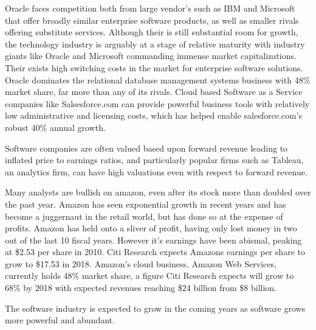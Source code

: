 Oracle faces competition both from large vendor's such as IBM and Microsoft that offer broadly similar enterprise software products, as well as smaller rivals offering substitute services.\autocite[]{finkle2012larry}
Although their is still substantial room for growth, the technology industry is arguably at a stage of relative maturity with industry giants like Oracle and Microsoft commanding immense market capitalizations.\autocite[]{finkle2012larry}
Their exists high switching costs in the market for enterprise software solutions.\autocite[]{finkle2012larry}
Oracle dominates the relational database management systems business with 48\% market share, far more than any of its rivals.\autocite[]{finkle2012larry}
Cloud based Software as a Service companies like Salsesforce.com can provide powerful business tools with relatively low administrative and licensing costs, which has helped enable salesforce.com's robust 40\% annual growth.\autocite[]{HorizontalPlaysTechnology}

Software companies are often valued based upon forward revenue leading to inflated price to earnings ratios, and particularly popular firms such as Tableau, an analytics firm, can have high valuations even with respect to forward revenue.\autocite[]{HorizontalPlaysTechnology}

Many analysts are bullish on amazon, even after its stock more than doubled over the past year.\autocite[]{AmazonDouble}
Amazon has seen exponential growth in recent years and has become a juggernaut in the retail world, but has done so at the expense of profits.\autocite[]{AmazonProfit}
Amazon has held onto a sliver of profit, having only lost money in two out of the last 10 fiscal years. However it's earnings have been abismal, peaking at \$2.53 per share in 2010.\autocite[]{AmazonProfit}
Citi Research expects Amazons earnings per share to grow to \$17.53 in 2018.\autocite[]{AmazonProfit}
Amazon's cloud business, Amazon Web Services, currently holds 48\% market share, a figure Citi Research expects will grow to 68\% by 2018 with expected revenues reaching \$24 billion from \$8 billion.\autocite[]{AmazonProfit}

The software industry is expected to grow in the coming years as software grows more powerful and abundant.\autocite[21]{SurveysSoftware2015}
